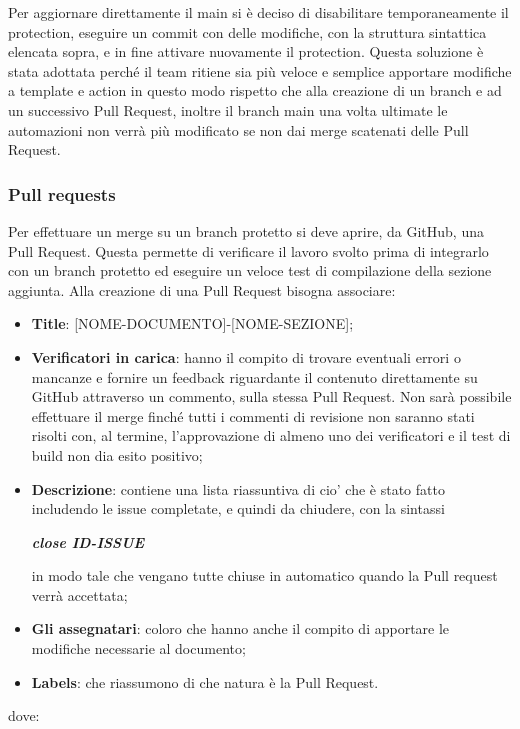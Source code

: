         Per aggiornare direttamente il main si è deciso di disabilitare temporaneamente
        il protection, eseguire un commit con delle modifiche, con la struttura sintattica elencata sopra, e in fine attivare nuovamente il protection.
        Questa soluzione è stata adottata perché il team ritiene sia più veloce e semplice apportare modifiche a template e action in questo modo
        rispetto che alla creazione di un branch e ad un successivo Pull Request, inoltre il branch main una volta ultimate le automazioni non verrà più modificato se non dai merge
        scatenati delle Pull Request.

        \subsubsection{Pull requests}\label{inf:pr}
        Per effettuare un merge su un branch protetto si deve aprire, da GitHub, una Pull Request. Questa
        permette di verificare il lavoro svolto prima di integrarlo con un branch protetto ed eseguire un veloce test di compilazione della sezione aggiunta.
        Alla creazione di una Pull Request bisogna associare:
        \begin{itemize}
            \item \textbf{Title}: [NOME-DOCUMENTO]-[NOME-SEZIONE];
            \item \textbf{Verificatori in carica}: hanno il compito di trovare eventuali errori o mancanze e fornire un feedback
            riguardante il contenuto direttamente su GitHub attraverso un commento, sulla stessa Pull Request.
            Non sarà possibile effettuare il merge finché tutti i commenti di revisione non saranno stati risolti
            con, al termine, l'approvazione di almeno uno dei verificatori e il test di build non dia esito positivo;
            \item \textbf{Descrizione}: contiene una lista riassuntiva di cio' che è stato fatto includendo le issue completate, e quindi da chiudere,
            con la sintassi
            \begin{center}
                \textbf{\textit{close ID-ISSUE}}
            \end{center}
            in modo tale che vengano tutte chiuse in automatico quando la Pull request verrà accettata;
            \item \textbf{Gli assegnatari}: coloro che hanno anche il compito di apportare le modifiche necessarie al documento;
            \item \textbf{Labels}: che riassumono di che natura è la Pull Request.
        \end{itemize}
        dove:

